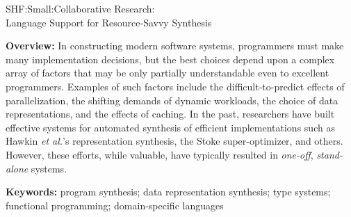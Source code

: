 \documentclass[12pt]{article}
\begin{document}
\setcounter{page}{1}

 \begin{large}
\begin{center}
SHF:Small:Collaborative Research: \\
Language Support for Resource-Savvy Synthesis
\end{center}
\end{large}

\noindent
\textbf{Overview:}   
In constructing modern software systems, 
programmers must make many implementation decisions, but
the best choices depend upon a complex array of factors that may be
only partially understandable even to excellent programmers.
Examples of such factors include the difficult-to-predict effects of 
parallelization, the shifting demands of dynamic workloads,  the
choice of data representations, and the effects of caching.
In the past, researchers have built effective systems 
for automated synthesis of efficient
implementations such as Hawkin \emph{et al.}'s representation
synthesis, the Stoke super-optimizer, and others.
However, these efforts, while valuable, have typically resulted in 
\emph{one-off}, \emph{stand-alone} systems.

\noindent\textbf{Keywords:} program synthesis; data representation synthesis;
type systems; functional programming; domain-specific languages
\end{document}
